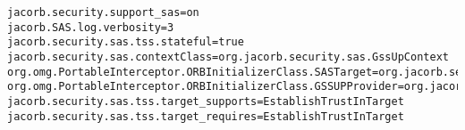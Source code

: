 \begin{scriptsize}
\begin{verbatim}
jacorb.security.support_sas=on
jacorb.SAS.log.verbosity=3
jacorb.security.sas.tss.stateful=true
jacorb.security.sas.contextClass=org.jacorb.security.sas.GssUpContext
org.omg.PortableInterceptor.ORBInitializerClass.SASTarget=org.jacorb.security.sas.SASTargetInitializer
org.omg.PortableInterceptor.ORBInitializerClass.GSSUPProvider=org.jacorb.security.sas.GSSUPProviderInitializer
jacorb.security.sas.tss.target_supports=EstablishTrustInTarget
jacorb.security.sas.tss.target_requires=EstablishTrustInTarget
\end{verbatim}
\end{scriptsize}

